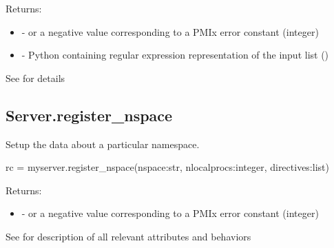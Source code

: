 \begin{arglist}
\end{arglist}

Returns:

\begin{itemize}
    \item {} -  or a negative value corresponding to a PMIx error constant (integer)
    \item {} - Python  containing regular expression representation of the input list ()
\end{itemize}


See  for details


\subsection{Server.register_nspace}

\summary Setup the data about a particular namespace.

\format

\pyspecificstart
\begin{codepar}
rc = myserver.register_nspace(nspace:str,
                              nlocalprocs:integer,
                              directives:list)
\end{codepar}
\pyspecificend


\begin{arglist}
\end{arglist}

Returns:

\begin{itemize}
    \item {} -  or a negative value corresponding to a PMIx error constant (integer)
\end{itemize}


See  for description of all relevant attributes and behaviors


